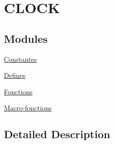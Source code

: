 \hypertarget{group___c_l_o_c_k__driver}{\section{C\+L\+O\+C\+K}
\label{group___c_l_o_c_k__driver}
}
\subsection*{Modules}
\begin{DoxyCompactItemize}
\item 
\hyperlink{group___c_l_o_c_k__constantes}{Constantes}
\item 
\hyperlink{group___c_l_o_c_k__defines}{Defines}
\item 
\hyperlink{group___c_l_o_c_k__fonctions}{Fonctions}
\item 
\hyperlink{group___c_l_o_c_k__macros}{Macro-\/fonctions}
\end{DoxyCompactItemize}


\subsection{Detailed Description}
